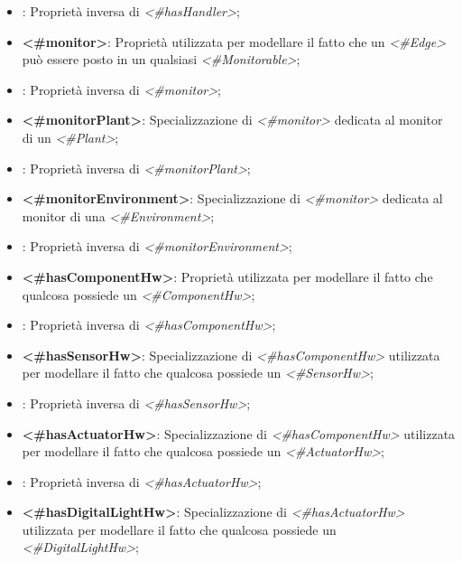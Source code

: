 \begin{itemize}
	\item {}: Proprietà inversa di \textit{<\#hasHandler>};

	\item \textbf{<\#monitor>}: Proprietà utilizzata per modellare il fatto che un \textit{<\#Edge>} può essere posto in un qualsiasi \textit{<\#Monitorable>};

	\item {}: Proprietà inversa di \textit{<\#monitor>};

	\item \textbf{<\#monitorPlant>}: Specializzazione di \textit{<\#monitor>} dedicata al monitor di un \textit{<\#Plant>};

	\item {}: Proprietà inversa di \textit{<\#monitorPlant>};

	\item \textbf{<\#monitorEnvironment>}: Specializzazione di \textit{<\#monitor>} dedicata al monitor di una \textit{<\#Environment>};

	\item {}: Proprietà inversa di \textit{<\#monitorEnvironment>};

	\item \textbf{<\#hasComponentHw>}: Proprietà utilizzata per modellare il fatto che qualcosa possiede un \textit{<\#ComponentHw>};

	\item {}: Proprietà inversa di \textit{<\#hasComponentHw>};

	\item \textbf{<\#hasSensorHw>}: Specializzazione di \textit{<\#hasComponentHw>} utilizzata per modellare il fatto che qualcosa possiede un \textit{<\#SensorHw>};

	\item {}: Proprietà inversa di \textit{<\#hasSensorHw>};

	\item \textbf{<\#hasActuatorHw>}: Specializzazione di \textit{<\#hasComponentHw>} utilizzata per modellare il fatto che qualcosa possiede un \textit{<\#ActuatorHw>};

	\item {}: Proprietà inversa di \textit{<\#hasActuatorHw>};

	\item \textbf{<\#hasDigitalLightHw>}: Specializzazione di \textit{<\#hasActuatorHw>} utilizzata per modellare il fatto che qualcosa possiede un \textit{<\#DigitalLightHw>};


\end{itemize}
